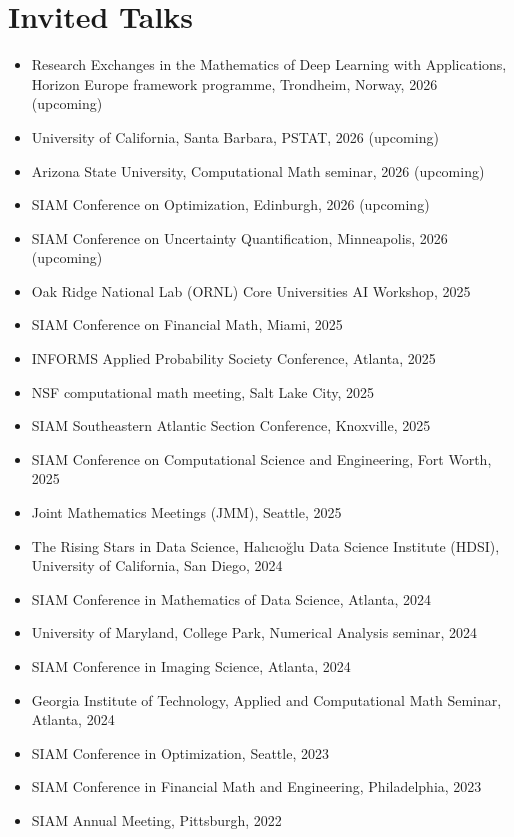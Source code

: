 \documentclass[11pt,a4paper,roman]{moderncv}
\begin{document}
\section{Invited Talks}
\begin{itemize}
\item Research Exchanges in the Mathematics of Deep Learning with Applications, Horizon Europe framework programme, Trondheim, Norway, 2026 (upcoming)
\item University of California, Santa Barbara, PSTAT, 2026 (upcoming)
\item Arizona State University, Computational Math seminar, 2026 (upcoming)
\item SIAM Conference on Optimization, Edinburgh, 2026 (upcoming)
\item SIAM Conference on Uncertainty Quantification, Minneapolis, 2026 (upcoming)
\item Oak Ridge National Lab (ORNL) Core Universities AI Workshop, 2025
\item SIAM Conference on Financial Math, Miami, 2025 
\item INFORMS Applied Probability Society Conference, Atlanta, 2025
\item NSF computational math meeting, Salt Lake City, 2025
\item SIAM Southeastern Atlantic Section Conference, Knoxville, 2025 
\item SIAM Conference on Computational Science and Engineering, Fort Worth, 2025 
\item Joint Mathematics Meetings (JMM), Seattle, 2025
\item The Rising Stars in Data Science, Hal{\i}c{\i}o\u{g}lu Data Science Institute (HDSI), University of California, San Diego, 2024
\item SIAM Conference in Mathematics of Data Science, Atlanta, 2024 
\item University of Maryland, College Park, Numerical Analysis seminar, 2024
\item SIAM Conference in Imaging Science, Atlanta, 2024
\item Georgia Institute of Technology, Applied and Computational Math Seminar, Atlanta, 2024 
\item SIAM Conference in Optimization, Seattle, 2023
\item SIAM Conference in Financial Math and Engineering, Philadelphia, 2023
\item SIAM Annual Meeting, Pittsburgh, 2022

\end{itemize}
\end{document}
